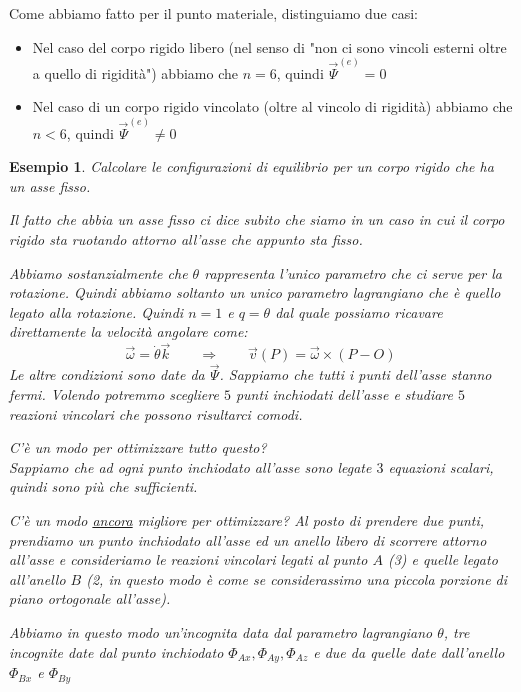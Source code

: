 \documentclass[11pt,a4paper,twoside]{article}
\newtheorem{es}{Esempio}
\theoremstyle{definition}
\begin{document}
Come abbiamo fatto per il punto materiale, distinguiamo due casi:
\begin{itemize}
	\item Nel caso del corpo rigido libero (nel senso di "non ci sono vincoli esterni oltre a quello di rigidità") abbiamo che $n = 6$, quindi $\vec \Psi^{(e)} = 0$
	\item Nel caso di un corpo rigido vincolato (oltre al vincolo di rigidità) abbiamo che $n<6$, quindi $\vec \Psi^{(e)}\neq 0$
\end{itemize}

\begin{es}
	Calcolare le configurazioni di equilibrio per un corpo rigido che ha un asse fisso.

	Il fatto che abbia un asse fisso ci dice subito che siamo in un caso in cui il corpo rigido sta ruotando attorno all'asse che appunto sta fisso.
	\begin{center}
	\end{center}
	Abbiamo sostanzialmente che $\theta$ rappresenta l'unico parametro che ci serve per la rotazione. Quindi abbiamo soltanto un unico parametro lagrangiano che è quello legato alla rotazione. Quindi $n = 1$ e $q = \theta$ dal quale possiamo ricavare direttamente la velocità angolare come:
	\[ \vec \omega = \dot \theta \vec k \qquad \Rightarrow \qquad \vec v(P) = \vec \omega \times (P-O) \]
	Le altre condizioni sono date da $\vec \Psi$. Sappiamo che tutti i punti dell'asse stanno fermi. Volendo potremmo scegliere $5$ punti inchiodati dell'asse e studiare $5$ reazioni vincolari che possono risultarci comodi.

	\textit{C'è un modo per ottimizzare tutto questo?}\\
	Sappiamo che ad ogni punto inchiodato all'asse sono legate $3$ equazioni scalari, quindi sono più che sufficienti.

	\textit{C'è un modo \underline{ancora} migliore per ottimizzare?}
	Al posto di prendere due punti, prendiamo un punto inchiodato all'asse ed un anello libero di scorrere attorno all'asse e consideriamo le reazioni vincolari legati al punto $A$ (3) e quelle legato all'anello $B$ (2, in questo modo è come se considerassimo una piccola porzione di piano ortogonale all'asse).

	Abbiamo in questo modo un'incognita data dal parametro lagrangiano $\theta$, tre incognite date dal punto inchiodato $\Phi_{Ax}, \Phi_{Ay},\Phi_{Az}$ e due da quelle date dall'anello $\Phi_{Bx}$ e $\Phi_{By}$
\end{es}
\end{document}
